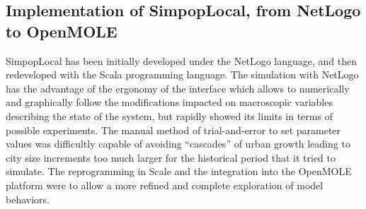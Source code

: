 \documentclass[10pt]{article}
\begin{document}
\subsection{Implementation of SimpopLocal, from NetLogo to OpenMOLE}


SimpopLocal has been initially developed under the NetLogo language, and then redeveloped with the Scala programming language. The simulation with NetLogo has the advantage of the ergonomy of the interface which allows to numerically and graphically follow the modifications impacted on macroscopic variables describing the state of the system, but rapidly showed its limits in terms of possible experiments. The manual method of trial-and-error to set parameter values was difficultly capable of avoiding ``cascades'' of urban growth leading to city size increments too much larger for the historical period that it tried to simulate. The reprogramming in Scale and the integration into the OpenMOLE platform were to allow a more refined and complete exploration of model behaviors.
\end{document}
